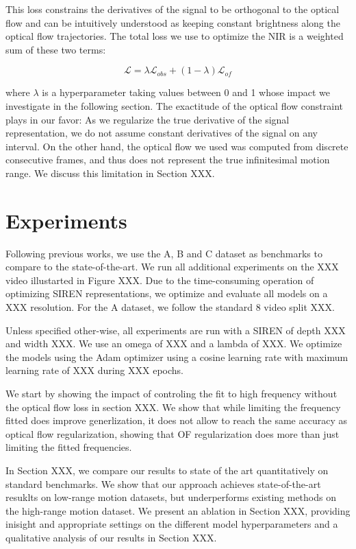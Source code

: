 \documentclass{article}
\begin{document}
This loss constrains the derivatives of the signal to be orthogonal to the optical flow and
can be intuitively understood as keeping constant brightness along the optical flow trajectories.
The total loss we use to optimize the NIR is a weighted sum of these two terms:

\begin{equation}
\mathcal{L} = \lambda \mathcal{L}_{obs} + (1-\lambda) \mathcal{L}_{of}
\end{equation}

where $\lambda$ is a hyperparameter taking values between 0 and 1 whose impact we investigate in the following section.
The exactitude of the optical flow constraint plays in our favor:
As we regularize the true derivative of the signal representation, we do not assume constant derivatives of the signal on any interval.
On the other hand, the optical flow we used was computed from discrete consecutive frames,
and thus does not represent the true infinitesimal motion range.
We discuss this limitation in Section XXX.

\section{Experiments}

Following previous works, we use the A, B and C dataset as benchmarks to compare to the state-of-the-art.
We run all additional experiments on the XXX video illustarted in Figure XXX.
Due to the time-consuming operation of optimizing SIREN representations, we optimize and evaluate all models on a XXX resolution.
For the A dataset, we follow the standard 8 video split XXX.

Unless specified other-wise, all experiments are run with a SIREN of depth XXX and width XXX.
We use an omega of XXX and a lambda of XXX.
We optimize the models using the Adam optimizer using a cosine learning rate with maximum learning rate of XXX during XXX epochs.

We start by showing the impact of controling the fit to high frequency without the optical flow loss in section XXX.
We show that while limiting the frequency fitted does improve generlization, it does not allow to reach
the same accuracy as optical flow regularization, showing that OF regularization does more than just limiting the fitted frequencies.

In Section XXX, we compare our results to state of the art quantitatively on standard benchmarks.
We show that our approach achieves state-of-the-art resuklts on low-range motion datasets, but underperforms existing methods on the high-range motion dataset.
We present an ablation in Section XXX, providing inisight and appropriate settings on the different model hyperparameters and a qualitative analysis of our results in Section XXX.
\end{document}
